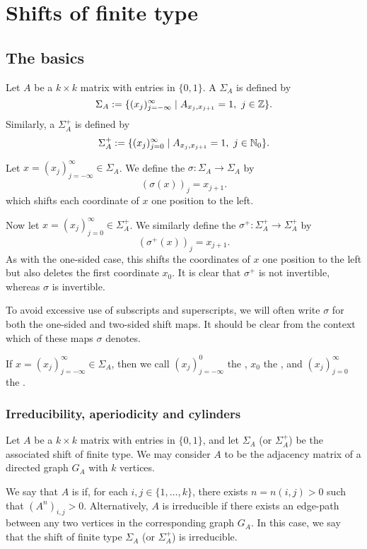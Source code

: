\chapter{Shifts of finite type}
\section{The basics}
Let $A$ be a $k \times k$ matrix with entries in $\{0, 1\}$. A  $\Sigma_A$ is defined by
\[
	\Sigma_A := \{(x_j)_{j = -\infty}^\infty \mid A_{x_j, x_{j + 1}} = 1,\ j \in \mathbb{Z}\}.
\]
Similarly, a  $\Sigma_A^+$ is defined by
\[
	\Sigma_A^+ := \{(x_j)_{j = 0}^\infty \mid A_{x_j, x_{j + 1}} = 1,\ j \in \mathbb{N}_0\}.
\]

Let $x = (x_j)_{j = -\infty}^\infty \in \Sigma_A$. We define the  $\sigma : \Sigma_A \to \Sigma_A$ by
\[
	(\sigma(x))_j = x_{j + 1}.
\]
which shifts each coordinate of $x$ one position to the left.

Now let $x = (x_j)_{j = 0}^\infty \in \Sigma_A^+$. We similarly define the  $\sigma^+ : \Sigma_A^+ \to \Sigma_A^+$ by
\[
	(\sigma^+(x))_j = x_{j + 1}.
\]
As with the one-sided case, this shifts the coordinates of $x$ one position to the left but also deletes the first coordinate $x_0$. It is clear that $\sigma^+$ is not invertible, whereas $\sigma$ is invertible.

To avoid excessive use of subscripts and superscripts, we will often write $\sigma$ for both the one-sided and two-sided shift maps. It should be clear from the context which of these maps $\sigma$ denotes.

If $x = (x_j)_{j = -\infty}^\infty \in \Sigma_A$, then we call $(x_j)_{j = -\infty}^0$ the , $x_0$ the , and $(x_j)_{j = 0}^\infty$ the .

\subsection{Irreducibility, aperiodicity and cylinders}
Let $A$ be a $k \times k$ matrix with entries in $\{0, 1\}$, and let $\Sigma_A$ (or $\Sigma_A^+$) be the associated shift of finite type. We may consider $A$ to be the adjacency matrix of a directed graph $G_A$ with $k$ vertices.

We say that $A$ is  if, for each $i, j \in \{1, \dots, k\}$, there exists $n = n(i, j) > 0$ such that $(A^n)_{i, j} > 0$. Alternatively, $A$ is irreducible if there exists an edge-path between any two vertices in the corresponding graph $G_A$. In this case, we say that the shift of finite type $\Sigma_A$ (or $\Sigma_A^+$) is irreducible.

